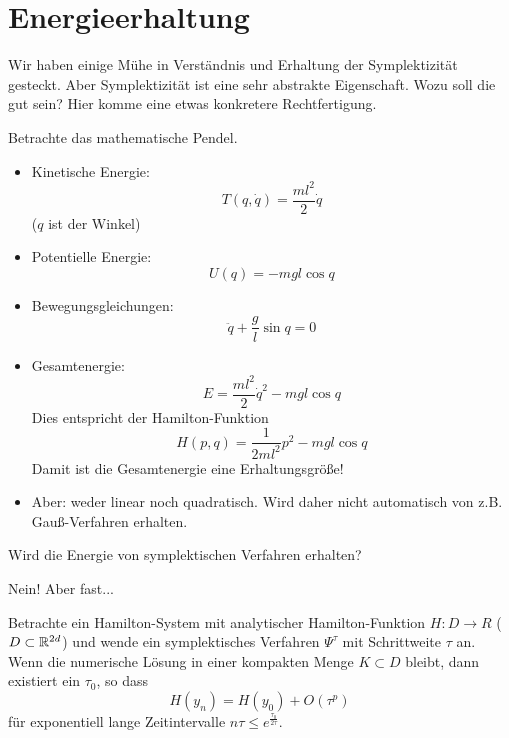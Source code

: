 \section{Energieerhaltung}

Wir haben einige Mühe in Verständnis und Erhaltung der Symplektizität gesteckt.
Aber Symplektizität ist eine sehr abstrakte Eigenschaft. Wozu soll die gut sein? Hier komme eine etwas konkretere Rechtfertigung.

Betrachte das mathematische Pendel.
\begin{itemize}
	\item Kinetische Energie:
	\begin{equation*}
		T(q, \dot q) = \frac{m l^2}{2} \dot q
	\end{equation*}
	($q$ ist der Winkel)
	\item Potentielle Energie:
	\begin{equation*}
		U(q) = -mgl \cos q
	\end{equation*}
	\item Bewegungsgleichungen:
	\begin{equation*}
		\ddot q + \frac gl \sin q = 0
	\end{equation*}
	\item Gesamtenergie:
	\begin{equation*}
		E = \frac{m l^2}2 \dot q^2 - mgl \cos q
	\end{equation*}
	Dies entspricht der Hamilton-Funktion
	\begin{equation*}
		H(p, q) = \frac{1}{2ml^2} p^2 - mgl \cos q
	\end{equation*}
	Damit ist die Gesamtenergie eine Erhaltungsgröße!
	\item Aber: weder linear noch quadratisch.
	Wird daher nicht automatisch von z.B. Gauß-Verfahren erhalten.
\end{itemize}

Wird die Energie von symplektischen Verfahren erhalten?

Nein! Aber fast...

\begin{satz}
	Betrachte ein Hamilton-System mit analytischer Hamilton-Funktion $H: D \to R$ ($D \subset \mathbb R^{2d}$) und wende ein symplektisches Verfahren $\Psi^\tau$ mit Schrittweite $\tau$ an. Wenn die numerische Lösung in einer kompakten Menge $K\subset D$ bleibt, dann existiert ein $\tau_0$, so dass
	\begin{equation*}
		H(y_n) = H(y_0) + O(\tau^p) %
	\end{equation*}
	für exponentiell lange Zeitintervalle $n\tau \le e^{\frac{\tau_0}{2 \tau}}$.
\end{satz}

